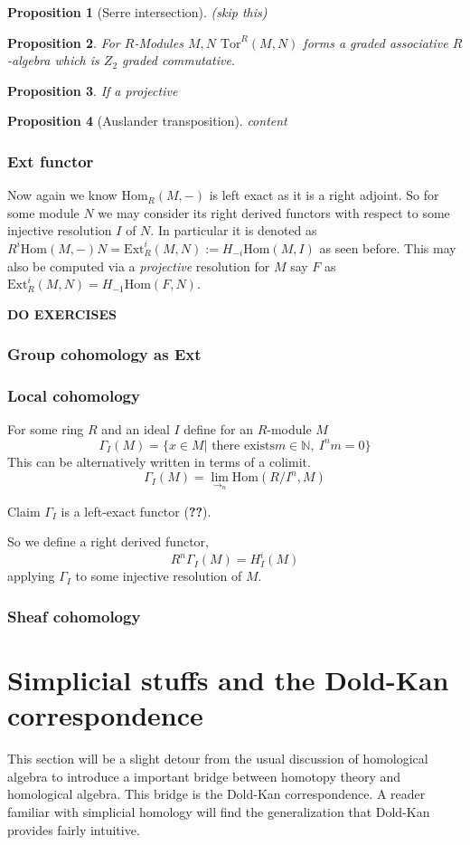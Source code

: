 \documentclass[12pt]{article}
\numberwithin{equation}{section}
\newcommand{\N}{\mathbb{N}}
\newcommand{\Hom}{{\mathrm{Hom}}}
\newtheorem{proposition}{Proposition}[section]
\begin{document}
	\begin{proposition}[Serre intersection](skip this)
	\end{proposition}
	
	\begin{proposition}
		For $R$-Modules $M,N$ \( \mathrm{Tor}^R(M,N) \) forms a graded associative $R$-algebra which is $Z_2$ graded commutative.
	\end{proposition}
	\begin{proposition}
		If a projective
	\end{proposition}
	\begin{proposition}[Auslander transposition]
		content
	\end{proposition}
	\subsubsection{Ext functor}
	Now again we know $\Hom_R(M,-)$ is left exact as it is a right adjoint. So for some module $N$ we may consider its right derived functors with respect to some injective resolution $I$ of $N$. In particular it is denoted as $R^i \Hom(M,-)N= \mathrm{Ext}_R^i(M,N):= H_{-i} \Hom(M,I)$ as seen before. This may also be computed via a \textit{projective} resolution for $M$ say $F$ as $\mathrm{Ext}_R^i (M,N)= H_{-1} \Hom(F,N)$.
	
	
	\textbf{DO EXERCISES}
	\subsubsection{Group cohomology as Ext}
	
	\subsubsection{Local cohomology}
	For some ring $R$ and an ideal $I$ define for an $R$-module $M$ $$\Gamma_I(M)=\{x \in M | \text{ there exists} m \in \N,\ I^n m =0\}$$
	This can be alternatively written in terms of a colimit.\[ \Gamma_I(M)= \lim_{\to_n} \Hom (R/I^n, M) \]
	
	Claim $\Gamma_I $ is a left-exact functor (\textbf{??}).
	
	So we define a right derived functor, \[ R^n \Gamma_I(M)=H_I^i(M) \] applying $\Gamma_I $ to some injective resolution of $M$.
	\subsubsection{Sheaf cohomology}
	
	\section{Simplicial stuffs and the Dold-Kan correspondence}
	This section will be a slight detour from the usual discussion of homological algebra to introduce a important bridge between homotopy theory and homological algebra. This bridge is the Dold-Kan correspondence. A reader familiar with simplicial homology will find the generalization that Dold-Kan provides fairly intuitive.
	
\end{document}
